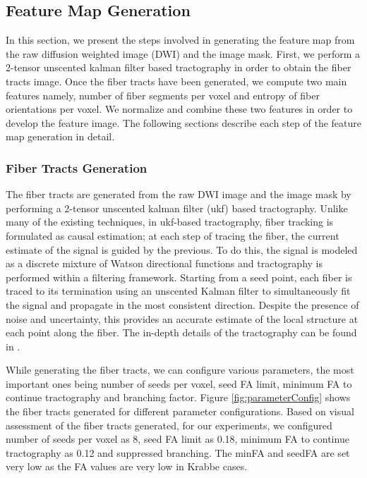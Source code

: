 \documentclass{llncs}
\begin{document}
%
\subsection{Feature Map Generation}
\label{subsec:FeatureMap}
%
In this section, we present the steps involved in generating the feature map from the raw diffusion weighted image (DWI) and the image mask. First, we perform a 2-tensor unscented kalman filter based tractography \cite{malc10} in order to obtain the fiber tracts image. Once the fiber tracts have been generated, we compute two main features namely, number of fiber segments per voxel and entropy of fiber orientations per voxel.  We normalize and combine these two features in order to develop the feature image. The following sections describe each step of the feature map generation in detail.

%
\subsubsection{Fiber Tracts Generation}
%
The fiber tracts are generated from the raw DWI image and the image mask by performing a 2-tensor unscented kalman filter (ukf) based tractography. Unlike many of the existing techniques, in ukf-based tractography, fiber tracking is formulated as causal estimation; at each step of tracing the fiber, the current estimate of the signal is guided by the previous. To do this, the signal is modeled as a discrete mixture of Watson directional functions and tractography is performed within a filtering framework. Starting from a seed point, each fiber is traced to its termination using an unscented Kalman filter to simultaneously fit the signal and propagate in the most consistent direction. Despite the presence of noise and uncertainty, this provides an accurate estimate of the local structure at each point along the fiber. The in-depth details of the tractography can be found in \cite{malc10}.  

While generating the fiber tracts, we can configure various parameters, the most important ones being number of seeds per voxel, seed FA limit, minimum FA to continue tractography and branching factor. Figure \ref{fig:parameterConfig} shows the fiber tracts generated for different parameter configurations. Based on visual assessment of the fiber tracts generated, for our experiments, we configured number of seeds per voxel as 8, seed FA limit as 0.18, minimum FA to continue tractography as 0.12 and suppressed branching. The minFA and seedFA are set very low as the FA values are very low in Krabbe cases.
\end{document}
